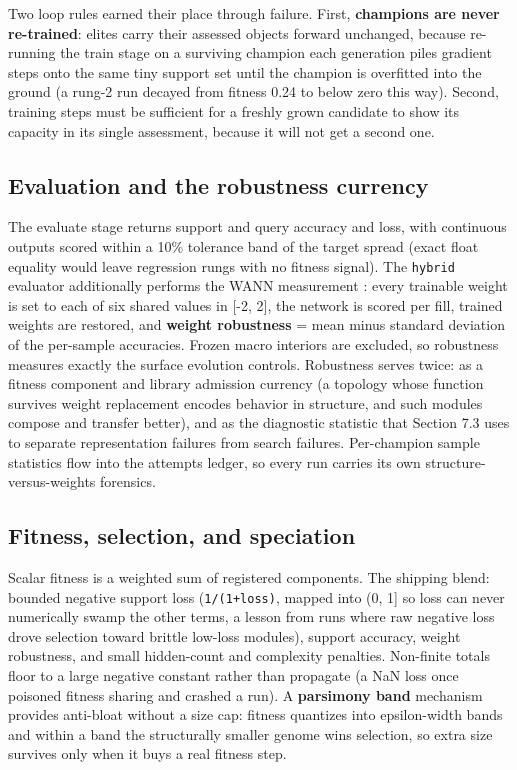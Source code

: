 \documentclass[11pt]{article}
\begin{document}
Two loop rules earned their place through failure. First, \textbf{champions are never re-trained}: elites carry their assessed objects forward unchanged, because re-running the train stage on a surviving champion each generation piles gradient steps onto the same tiny support set until the champion is overfitted into the ground (a rung-2 run decayed from fitness 0.24 to below zero this way). Second, training steps must be sufficient for a freshly grown candidate to show its capacity in its single assessment, because it will not get a second one.

\subsection{Evaluation and the robustness currency}

The evaluate stage returns support and query accuracy and loss, with continuous outputs scored within a 10\% tolerance band of the target spread (exact float equality would leave regression rungs with no fitness signal). The \texttt{hybrid} evaluator additionally performs the WANN measurement \citep{gaier2019}: every trainable weight is set to each of six shared values in [-2, 2], the network is scored per fill, trained weights are restored, and \textbf{weight robustness} = mean minus standard deviation of the per-sample accuracies. Frozen macro interiors are excluded, so robustness measures exactly the surface evolution controls. Robustness serves twice: as a fitness component and library admission currency (a topology whose function survives weight replacement encodes behavior in structure, and such modules compose and transfer better), and as the diagnostic statistic that Section 7.3 uses to separate representation failures from search failures. Per-champion sample statistics flow into the attempts ledger, so every run carries its own structure-versus-weights forensics.

\subsection{Fitness, selection, and speciation}

Scalar fitness is a weighted sum of registered components. The shipping blend: bounded negative support loss (\texttt{1/(1+loss)}, mapped into (0, 1] so loss can never numerically swamp the other terms, a lesson from runs where raw negative loss drove selection toward brittle low-loss modules), support accuracy, weight robustness, and small hidden-count and complexity penalties. Non-finite totals floor to a large negative constant rather than propagate (a NaN loss once poisoned fitness sharing and crashed a run). A \textbf{parsimony band} mechanism provides anti-bloat without a size cap: fitness quantizes into epsilon-width bands and within a band the structurally smaller genome wins selection, so extra size survives only when it buys a real fitness step.
\end{document}
